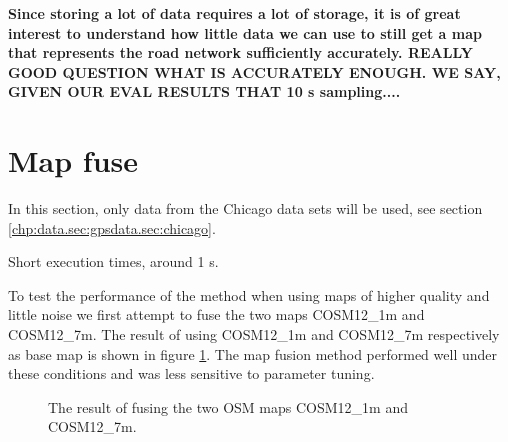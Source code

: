 \textbf{Since storing a lot of data requires a lot of storage, it is of great interest to understand how little data we can use to still get a map that represents the road network sufficiently accurately. REALLY GOOD QUESTION WHAT IS ACCURATELY ENOUGH. WE SAY, GIVEN OUR EVAL RESULTS THAT 10 s sampling.... }



\section{Map fuse}

In this section, only data from the Chicago data sets will be used, see section \ref{chp:data.sec:gpsdata.sec:chicago}. 

Short execution times, around 1 s.


To test the performance of the method when using maps of higher quality and little noise we first attempt to fuse the two maps COSM12\_1m and COSM12\_7m. The result of using COSM12\_1m and COSM12\_7m respectively as base map is shown in figure \ref{fig:results/fusecosm1m7m}. The map fusion method performed well under these conditions and was less sensitive to parameter tuning.

\begin{figure}[H]%
 \centering

  \caption{The result of fusing the two \ac{OSM} maps COSM12\_1m and COSM12\_7m.}%
 \label{fig:results/fusecosm1m7m}
\end{figure}



